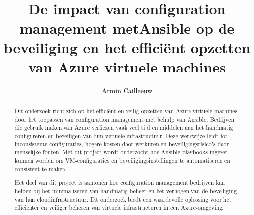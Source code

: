 \documentclass{hogent-article}
\title{De impact van configuration management met\linebreak Ansible op de beveiliging en het efficiënt opzetten van Azure virtuele machines}
\author{Armin Cailleeuw}
\begin{document}
\begin{abstract}
  Dit onderzoek richt zich op het efficiënt en veilig opzetten van Azure virtuele machines door het toepassen van configuration management met behulp van Ansible.
  Bedrijven die gebruik maken van Azure verliezen vaak veel tijd en middelen aan het handmatig configureren en beveiligen van hun virtuele infrastructuur.
  Deze werkwijze leidt tot inconsistente configuraties, hogere kosten door werkuren en beveiligingsrisico's door menselijke fouten.
  Met dit project wordt onderzocht hoe Ansible playbooks ingezet kunnen worden om VM-configuraties en beveiligingsinstellingen te automatiseren en consistent te maken.
  
  Het doel van dit project is aantonen hoe configuration management bedrijven kan helpen bij het minimaliseren van handmatig beheer en het verhogen van de beveiliging van hun cloudinfrastructuur.
  Dit onderzoek biedt een waardevolle oplossing voor het efficiënter en veiliger beheren van virtuele infrastructuren in een Azure-omgeving.
\end{abstract}

\tableofcontents



\printbibliography[heading=bibintoc]
\end{document}
